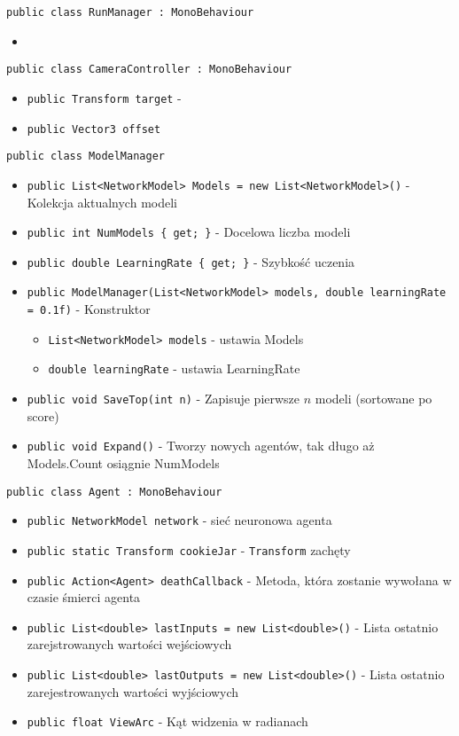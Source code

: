 \documentclass[12pt,a4paper]{article}
\begin{document}
\lstinline{public class RunManager : MonoBehaviour}
\begin{itemize}
    \item \lstinline||
\end{itemize}


\lstinline{public class CameraController : MonoBehaviour}
\begin{itemize}
    \item \lstinline|public Transform target| -
    \item \lstinline|public Vector3 offset|
\end{itemize}


\lstinline{public class ModelManager}
\begin{itemize}
    \item \lstinline|public List<NetworkModel> Models = new List<NetworkModel>()| - Kolekcja aktualnych modeli
    \item \lstinline|public int NumModels { get; }| - Docelowa liczba modeli
    \item \lstinline|public double LearningRate { get; }| - Szybkość uczenia
    \item \lstinline|public ModelManager(List<NetworkModel> models, double learningRate = 0.1f)| - Konstruktor
          \begin{itemize}
              \item \lstinline{List<NetworkModel> models} - ustawia Models
              \item \lstinline{double learningRate} - ustawia LearningRate
          \end{itemize}
    \item \lstinline|public void SaveTop(int n)| - Zapisuje pierwsze $n$ modeli (sortowane po score)
    \item \lstinline|public void Expand()| - Tworzy nowych agentów, tak długo aż Models.Count osiągnie NumModels
\end{itemize}


\lstinline{public class Agent : MonoBehaviour}
\begin{itemize}
    \item \lstinline|public NetworkModel network| - sieć neuronowa agenta
    \item \lstinline|public static Transform cookieJar| - \lstinline{Transform} zachęty
    \item \lstinline|public Action<Agent> deathCallback| - Metoda, która zostanie wywołana w czasie śmierci agenta
    \item \lstinline|public List<double> lastInputs = new List<double>()| - Lista ostatnio zarejstrowanych wartości wejściowych
    \item \lstinline|public List<double> lastOutputs = new List<double>()| - Lista ostatnio zarejestrowanych wartości wyjściowych
    \item \lstinline|public float ViewArc| - Kąt widzenia w radianach
\end{itemize}
\end{document}
